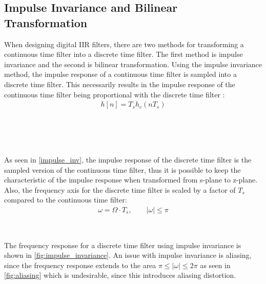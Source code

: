\subsection{Impulse Invariance and Bilinear Transformation}\label{sec:bilinear}
When designing digital IIR filters, there are two methods for transforming a continuous time filter into a discrete time filter. The first method is impulse invariance and the second is bilinear transformation. Using the impulse invariance method, the impulse response of a continuous time filter is sampled into a discrete time filter. This necessarily results in the impulse response of the continuous time filter being proportional with the discrete time filter \citep[p. 522]{oppenheim}:
\begin{align}
h[n] = T_sh_c(nT_s)
\label{impulse_inv}
\end{align}
\begin{where}
\\
\\
\\
\end{where}

As seen in \autoref{impulse_inv}, the impulse response of the discrete time filter is the sampled version of the continuous time filter, thus it is possible to keep the characteristic of the impulse response when transformed from s-plane to z-plane. Also, the frequency axis for the discrete time filter is scaled by a factor of $T_s$ compared to the continuous time filter\citep[p. 522]{oppenheim}:
\begin{align}
\omega = \Omega \cdot T_s, \qquad |\omega | \le \pi
\label{impulse_inv2}
\end{align}
\begin{where}
\\
\end{where}

The frequency response for a discrete time filter using impulse invariance is shown in \autoref{fig:impulse_invariance}. An issue with impulse invariance is aliasing, since the frequency response extends to the area $\pi \le |\omega| \le 2\pi$ as seen in \autoref{fig:aliasing} which is undesirable, since this introduces aliasing distortion.

